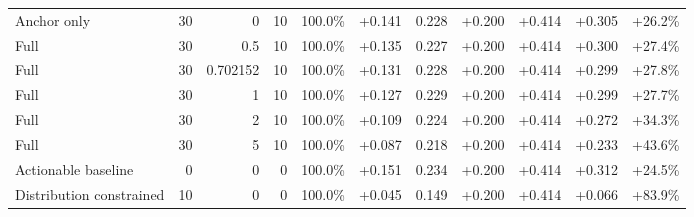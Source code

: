\begin{table}[htbp]
\begin{tabular}{lrrrccccccc}
Anchor only & 30 & 0 & 10 & 100.0\% & +0.141 & 0.228 & +0.200 & +0.414 & +0.305 & +26.2\% \\
Full & 30 & 0.5 & 10 & 100.0\% & +0.135 & 0.227 & +0.200 & +0.414 & +0.300 & +27.4\% \\
Full & 30 & 0.702152 & 10 & 100.0\% & +0.131 & 0.228 & +0.200 & +0.414 & +0.299 & +27.8\% \\
Full & 30 & 1 & 10 & 100.0\% & +0.127 & 0.229 & +0.200 & +0.414 & +0.299 & +27.7\% \\
Full & 30 & 2 & 10 & 100.0\% & +0.109 & 0.224 & +0.200 & +0.414 & +0.272 & +34.3\% \\
Full & 30 & 5 & 10 & 100.0\% & +0.087 & 0.218 & +0.200 & +0.414 & +0.233 & +43.6\% \\
Actionable baseline & 0 & 0 & 0 & 100.0\% & +0.151 & 0.234 & +0.200 & +0.414 & +0.312 & +24.5\% \\
Distribution constrained & 10 & 0 & 0 & 100.0\% & +0.045 & 0.149 & +0.200 & +0.414 & +0.066 & +83.9\% \\
\bottomrule
\end{tabular}
\end{table}